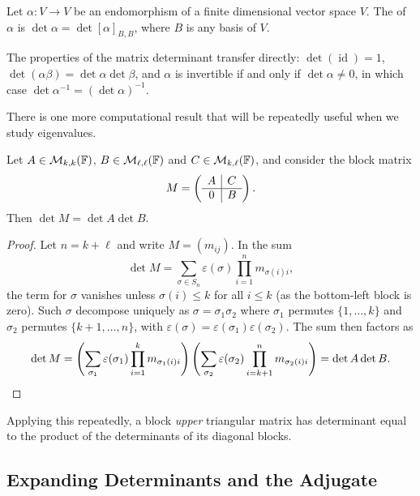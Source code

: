 \documentclass[a4paper]{scrartcl}
\begin{document}
\begin{definition}
    Let $\alpha: V \rightarrow V$ be an endomorphism of a finite dimensional vector space $V$. The  of $\alpha$ is $\det \alpha = \det [\alpha]_{B, B}$, where $B$ is any basis of $V$.
\end{definition}

The properties of the matrix determinant transfer directly: $\det (\operatorname{id}) = 1$, $\det (\alpha\beta) = \det \alpha \det \beta$, and $\alpha$ is invertible if and only if $\det \alpha \neq 0$, in which case $\det \alpha^{-1} = (\det \alpha)^{-1}$.

There is one more computational result that will be repeatedly useful when we study eigenvalues.

\begin{lemma}
    Let $A \in \mathcal{M}_{k,k}(\mathbb{F})$, $B \in \mathcal{M}_{\ell,\ell}(\mathbb{F})$ and $C \in \mathcal{M}_{k, \ell}(\mathbb{F})$, and consider the block matrix
    $$
    M = \left(\begin{array}{ c | c }
        A & C \\
        \hline
        0 & B
      \end{array}\right).
    $$
    Then $\det M = \det A \det B$.
\end{lemma}
\begin{proof}
    Let $n = k + \ell$ and write $M = (m_{ij})$. In the sum
    $$
    \det M = \sum_{\sigma \in S_n} \varepsilon(\sigma) \prod_{i = 1}^n m_{\sigma(i)i},
    $$
    the term for $\sigma$ vanishes unless $\sigma(i) \leq k$ for all $i \leq k$ (as the bottom-left block is zero). Such $\sigma$ decompose uniquely as $\sigma = \sigma_1\sigma_2$ where $\sigma_1$ permutes $\{1, \dots, k\}$ and $\sigma_2$ permutes $\{k + 1, \dots, n\}$, with $\varepsilon(\sigma) = \varepsilon(\sigma_1)\varepsilon(\sigma_2)$. The sum then factors as
    $$
    \det M = \left(\sum_{\sigma_1} \varepsilon(\sigma_1) \prod_{i = 1}^{k} m_{\sigma_1(i)i}\right)\left(\sum_{\sigma_2} \varepsilon(\sigma_2) \prod_{i = k+1}^{n} m_{\sigma_2(i)i}\right) = \det A \det B. \qedhere
    $$
\end{proof}

Applying this repeatedly, a block \emph{upper} triangular matrix has determinant equal to the product of the determinants of its diagonal blocks.

\subsection{Expanding Determinants and the Adjugate}
\end{document}

